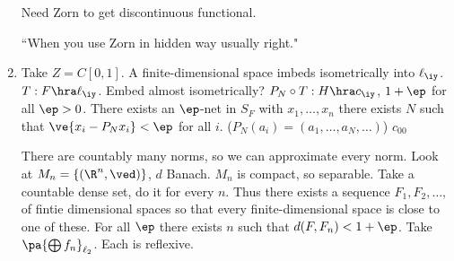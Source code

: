 \begin{enumerate}
Need Zorn to get discontinuous functional. 

``When you use Zorn in hidden way usually right."
\item
Take $Z=C[0,1]$. A finite-dimensional space imbeds isometrically into $\ell_{\iy}$. $T:F\hra \ell_{\iy}$. Embed almost isometrically? $P_N\circ T:H\hra c_{\iy}$, $1+\ep$ for all $\ep>0$. There exists an $\ep$-net in $S_F$ with $x_1,\ldots, x_n$ there exists $N$ such that $\ve{x_i-P_Nx_i}<\ep$ for all $i$. ($P_N(a_i)=(a_1,\ldots, a_N,\ldots)$)
$c_{00}$

There are countably many norms, so we can approximate every norm. 
Look at $M_n=\{(\R^n,\ved)\}$, $d$ Banach. %
$M_n$ is compact, so separable. Take a countable dense set, do it for every $n$. Thus there exists a sequence $F_1,F_2,\ldots, $ of fintie dimensional spaces so that every finite-dimensional space is close to one of these. For all $\ep$ there exists $n$ such that $d(F,F_n)<1+\ep$. Take $\pa{\bigoplus f_n}_{\ell_2}$. Each is reflexive.
\end{enumerate}
